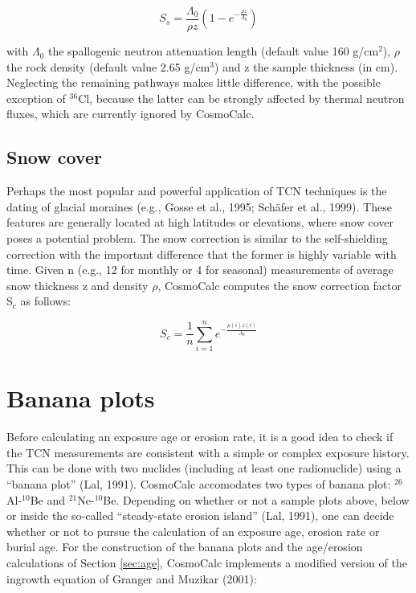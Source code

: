 \documentclass{article}
\begin{document}
\begin{equation}
  \label{eq:self}
  S_s = \frac{\Lambda_0}{\rho z} \left(1 - e^{-\frac{\rho  z}{\Lambda_0}}\right)
\end{equation}

with $\Lambda_0$  the spallogenic neutron  attenuation length (default
value  160 g/cm$^2$),  $\rho$  the rock  density  (default value  2.65
g/cm$^3$)  and  z  the  sample  thickness  (in  cm).   Neglecting  the
remaining  pathways   makes  little  difference,   with  the  possible
exception of $^{36}$Cl, because the latter can be strongly affected by
thermal neutron fluxes, which are currently ignored by CosmoCalc.

\subsection{Snow cover}

Perhaps the most popular and powerful application of TCN techniques is
the dating of glacial moraines  (e.g., Gosse et al., 1995; Sch\"{a}fer
et al., 1999).  These features are generally located at high latitudes
or elevations, where  snow cover poses a potential  problem.  The snow
correction  is  similar  to  the self-shielding  correction  with  the
important difference  that the  former is highly  variable with  time. 
Given  n (e.g.,  12 for  monthly or  4 for  seasonal)  measurements of
average snow  thickness z and  density $\rho$, CosmoCalc  computes the
snow correction factor S$_c$ as follows:

\begin{equation}
  \label{eq:snow}
  S_c = \frac{1}{n} \sum_{i=1}^{n} e^{-\frac{\rho(i)  z(i)}{\Lambda_0}}
\end{equation}

\section{Banana plots}\label{sec:banana}

Before calculating an exposure age or  erosion rate, it is a good idea
to  check if  the TCN  measurements are  consistent with  a  simple or
complex  exposure  history.   This  can  be  done  with  two  nuclides
(including at  least one radionuclide)  using a ``banana  plot'' (Lal,
1991).    CosmoCalc   accomodates    two   types   of   banana   plot:
$^{26}$Al-$^{10}$Be and $^{21}$Ne-$^{10}$Be.   Depending on whether or
not a sample plots above, below or inside the so-called ``steady-state
erosion island'' (Lal, 1991), one  can decide whether or not to pursue
the calculation of  an exposure age, erosion rate  or burial age.  For
the construction of the  banana plots and the age/erosion calculations
of Section  \ref{sec:age}, CosmoCalc implements a  modified version of
the ingrowth equation of Granger and Muzikar (2001):
\end{document}
